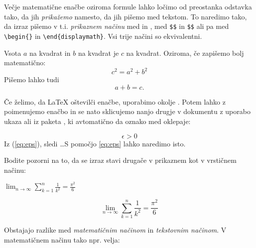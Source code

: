 Večje matematične enačbe oziroma formule lahko ločimo od preostanka
odstavka tako, da jih 
\emph{prikažemo} namesto, da jih pišemo med tekstom. To naredimo tako,
da izraz pišemo v t.i. \emph{prikaznem načinu} med
\ci{[} in \ci{]}, med \verb|$$| in \verb|$$| ali pa med 
\verb|\begin{|\verb|}| in
  \verb|\end{displaymath}|. Vsi trije načini so ekvivalentni. 
\begin{example}
Vsota $a$ na kvadrat in $b$ na 
kvadrat je $c$ na kvadrat. Oziroma, 
če zapišemo bolj matematično:
\begin{displaymath}
c^{2}=a^{2}+b^{2}
\end{displaymath}
Pišemo lahko tudi $$a+b=c.$$
\end{example}

Če želimo, da \LaTeX{} oštevilči enačbe, uporabimo okolje .
Potem lahko z  poimenujemo enačbo in se nato
sklicujemo nanjo drugje v dokumentu z uporabo 
ukaza  ali  iz paketa , ki avtomatično
da oznako med oklepaje:
\begin{example}
\begin{equation} \label{eq:eps}
\epsilon > 0
\end{equation}
Iz (\ref{eq:eps}), sledi 
\ldots{}S pomočjo \eqref{eq:eps}
lahko naredimo isto.
\end{example}

Bodite pozorni na to, da se izraz stavi drugače v prikaznem kot v 
vrstičnem načinu:
\begin{example}
$\lim_{n \to \infty} 
\sum_{k=1}^n \frac{1}{k^2} 
= \frac{\pi^2}{6}$
\end{example}
\begin{example}
\begin{displaymath}
\lim_{n \to \infty} 
\sum_{k=1}^n \frac{1}{k^2}
= \frac{\pi^2}{6}
\end{displaymath}
\end{example}

Obstajajo razlike med \emph{matematičnim načinom} in \emph{tekstovnim načinom}. 
V matematičnem načinu tako npr. velja: 

